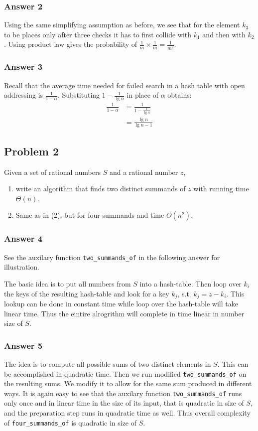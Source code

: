 \documentclass[11pt]{article}
\begin{document}
\subsubsection{Answer 2}
\label{sec-1-1-2}
Using the same simplifying assumption as before, we see that for the element
$k_3$ to be places only after three checks it has to first collide with
$k_1$ and then with $k_2$.  Using product law gives the probability of
$\frac{1}{m}\times\frac{1}{m}=\frac{1}{m^2}$.

\subsubsection{Answer 3}
\label{sec-1-1-3}
Recall that the average time needed for failed search in a hash table with
open addressing is $\frac{1}{1-\alpha}$.  Substituting $1-\frac{1}{\lg n}$
in place of $\alpha$ obtains:
\begin{align*}
  \frac{1}{1-\alpha} &= \frac{1}{1-\frac{1}{\lg n}} \\
  &= \frac{\lg n}{\lg n - 1}
\end{align*}

\subsection{Problem 2}
\label{sec-1-2}
Given a set of rational numbers $S$ and a rational number $z$,
\begin{enumerate}
\item write an algorithm that finds two distinct summands of $z$ with running
time $\Theta(n)$.
\item Same as in (2), but for four summands and time $\Theta(n^2)$.
\end{enumerate}

\subsubsection{Answer 4}
\label{sec-1-2-1}
See the auxilary function \texttt{two\_summands\_of} in the following answer for
illustration.

The basic idea is to put all numbers from $S$ into a hash-table.  Then loop
over $k_i$ the keys of the resulting hash-table and look for a key $k_j$,
s.t.  $k_j = z - k_i$.  This lookup can be done in constant time while loop
over the hash-table will take linear time.  Thus the eintire alrogrithm will
complete in time linear in number size of $S$.

\subsubsection{Answer 5}
\label{sec-1-2-2}
The idea is to compute all possible sums of two distinct elements in $S$.
This can be accomplished in quadratic time.  Then we run modified
\texttt{two\_summands\_of} on the resulting sums.  We modify it to allow for the same
sum produced in different ways.  It is again easy to see that the auxilary
function \texttt{two\_summands\_of} runs only once and in linear time in the size of
its input, that is quadratic in size of $S$, and the preparation step runs
in quadratic time as well.  Thus overall complexity of \texttt{four\_summands\_of} is
quadratic in size of $S$.
\end{document}
